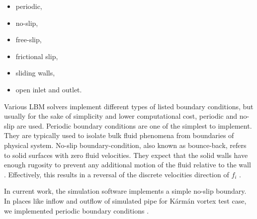 \begin{itemize}
	\item periodic,
	\item no-slip,
	\item free-slip,
	\item frictional slip,
	\item sliding walls,
	\item open inlet and outlet.
\end{itemize}

Various LBM solvers implement different types of listed boundary conditions, but usually for the sake of simplicity and lower computational cost, periodic and no-slip are used. Periodic boundary conditions are one of the simplest to implement. They are typically used to isolate bulk fluid phenomena from boundaries of physical system. No-slip boundary-condition, also known as bounce-back, refers to solid surfaces with zero fluid velocities. They expect that the solid walls have enough rugosity to prevent any additional motion of the fluid relative to the wall \citep{succi2018}. Effectively, this results in a reversal of the discrete velocities direction of $f_i$ \citep{Mawson2014InteractiveFI}.

In current work, the simulation software implements a simple no-slip boundary. In places like inflow and outflow of simulated pipe for Kármán vortex test case, we implemented periodic boundary conditions \citep{succi2001lattice}.

%
%
%
%
%
%
%

